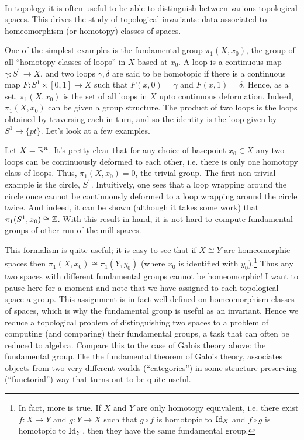 \documentclass{../../mathnotes}
\begin{document}
\begin{exmp}\hfill\\
    In topology it is often useful to be able to distinguish between various topological spaces. This drives
    the study of topological invariants: data associated to homeomorphism (or homotopy) classes of spaces.
    
    One of the simplest examples is the fundamental group $\pi_1(X,x_0)$, the group of all ``homotopy classes of loops''
    in $X$ based at $x_0$. A loop is a continuous map $\gamma:S^1\to X$, and two loops $\gamma,\delta$ are said to be homotopic if there
    is a continuous map $F:S^1\times [0,1]\to X$ such that $F(x,0)=\gamma$ and $F(x,1)=\delta$. Hence, as a set,
    $\pi_1(X,x_0)$ is the set of all loops in $X$ upto continuous deformation. Indeed, $\pi_1(X,x_0)$ can be given a 
    group structure. The product of two loops is the loops obtained by traversing each in turn, and so the identity
    is the loop given by $S^1\mapsto \{pt\}$. Let's look at a few examples.

    Let $X=\mathbb{R}^n$. It's pretty clear that for any choice of basepoint $x_0\in X$ any two loops can
    be continuously deformed to each other, i.e. there is only one homotopy class of loops. Thus,
    $\pi_1(X,x_0)=0$, the trivial group. The first non-trivial example is the circle, $S^1$. Intuitively, one sees
    that a loop wrapping around the circle once cannot be continuously deformed to a loop wrapping around the circle
    twice. And indeed, it can be shown (although it takes some work) that $\pi_1(S^1,x_0)\cong\mathbb{Z}$.
    With this result in hand, it is not hard to compute fundamental groups of other run-of-the-mill spaces.

    This formalism is quite useful; it is easy to see that if $X\cong Y$ are homeomorphic spaces then
    $\pi_1(X,x_0)\cong\pi_1(Y,y_0)$ (where $x_0$ is identified with $y_0$).\footnote{In fact, more is true.
    If $X$ and $Y$ are only homotopy equivalent, i.e. there exist $f:X\to Y$ and $g:Y\to X$ such that
    $g\circ f$ is homotopic to $\operatorname{Id}_X$ and $f\circ g$ is homotopic to $\operatorname{Id}_Y$, then they have the same fundamental
    group.} 
    Thus any two spaces with different fundamental groups cannot be homeomorphic!
    I want to pause here for a moment and note that we have assigned to each topological space a group. This assignment
    is in fact well-defined on homeomorphism classes of spaces, which is why the fundamental group is useful as
    an invariant. Hence we reduce a topological problem of distinguishing two spaces to a problem of computing (and
    comparing) their fundamental groups, a task that can often be reduced to algebra.
    Compare this to the case of Galois theory above: the fundamental group, like the fundamental theorem
    of Galois theory, associates objects from two very different worlds (``categories'') in some structure-preserving
    (``functorial'') way that turns out to be quite useful.
\end{exmp}
\end{document}
